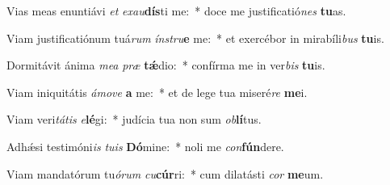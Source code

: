 \item Vias meas enuntiávi \textit{et} \textit{ex}\textit{au}\textbf{dís}ti me:~* doce me justificatió\textit{nes} \textbf{tu}as.
\item Viam justificatiónum tuá\textit{rum} \textit{ín}\textit{stru}\textbf{e} me:~* et exercébor in mirabíli\textit{bus} \textbf{tu}is.
\item Dormitávit ánima \textit{me}\textit{a} \textit{præ} \textbf{tǽ}dio:~* confírma me in ver\textit{bis} \textbf{tu}is.
\item Viam iniquitátis \textit{á}\textit{mo}\textit{ve} \textbf{a} me:~* et de lege tua miseré\textit{re} \textbf{me}i.
\item Viam veri\textit{tá}\textit{tis} \textit{e}\textbf{lé}gi:~* judícia tua non sum \textit{ob}\textbf{lí}tus.
\item Adhǽsi testimóni\textit{is} \textit{tu}\textit{is} \textbf{Dó}mine:~* noli me \textit{con}\textbf{fún}dere.
\item Viam mandatórum tu\textit{ó}\textit{rum} \textit{cu}\textbf{cúr}ri:~* cum dilatásti \textit{cor} \textbf{me}um.
